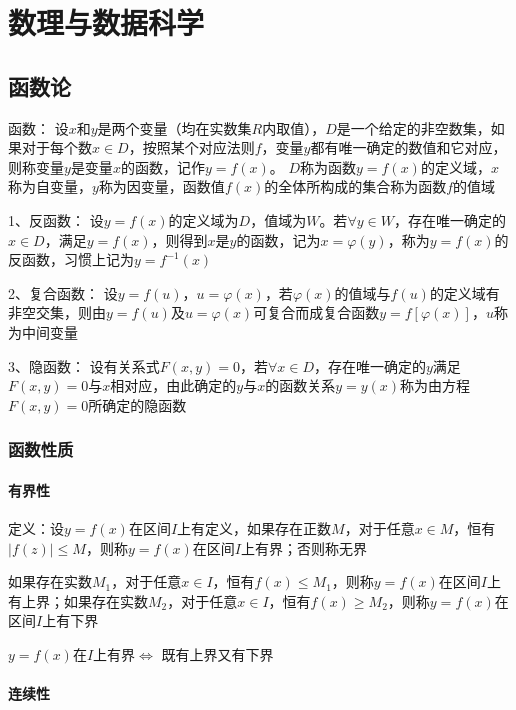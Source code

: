 \documentclass[12pt]{book}
\begin{document}
\part{数理与数据科学}


\chapter{函数论}




函数：
设$x$和$y$是两个变量（均在实数集$R$内取值），$D$是一个给定的非空数集，如果对于每个数$x\in D$，按照某个对应法则$f$，变量$y$都有唯一确定的数值和它对应，则称变量$y$是变量$x$的函数，记作$y= f(x)$。
$D$称为函数$y= f(x)$的定义域，$x$称为自变量，$y$称为因变量，函数值$ f(x)$的全体所构成的集合称为函数$f$的值域

1、反函数：
设$y= f(x)$的定义域为$D$，值域为$W$。若$\forall y \in W$，存在唯一确定的$x \in D$，满足$y= f(x)$，则得到$x$是$y$的函数，记为$ x =\varphi(y)$，称为$y= f(x)$的反函数，习惯上记为$ y= f^{-1}(x)$

2、复合函数：
设$ y = f(u)$，$u=\varphi(x)$，若$\varphi(x)$的值域与$f(u)$的定义域有非空交集，则由$ y = f(u)$及$u=\varphi(x)$可复合而成复合函数$ y = f[\varphi(x)]$，$u$称为中间变量

3、隐函数：
设有关系式$ F(x,y)=0$，若$\forall x\in D$，存在唯一确定的$y$满足$F(x,y)= 0$与$x$相对应，由此确定的$y$与$ x $的函数关系$y = y(x)$称为由方程$  F(x,y)= 0  $所确定的隐函数






\section{函数性质}


\subsection{有界性}

定义：设$y=f(x)$在区间$I$上有定义，如果存在正数$M$，对于任意$ x \in M$，恒有$|f(z)|\leq M$，则称$y=f(x)$在区间$I$上有界；否则称无界

如果存在实数$M_1$，对于任意$x\in I$，恒有$f(x)\leq M_1$，则称$y=f(x)$在区间$I$上有上界；如果存在实数$ M_2$，对于任意$x\in  I$，恒有$ f(x)\geq M_2$，则称$y=f(x)$在区间$I$上有下界

$y=f(x)$在$I$上有界$\Leftrightarrow$ 既有上界又有下界

\subsection{连续性}
\end{document}
